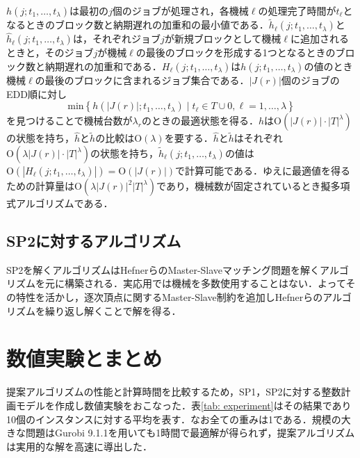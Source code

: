 \documentclass[twoside,twocolumn,11pt]{jarticle}  %
\begin{document}
$h(j; t_1, \dots, t_\lambda)$は最初の$j$個のジョブが処理され，各機械$\ell$の処理完了時間が$t_\ell$となるときのブロック数と納期遅れの加重和の最小値である．$\tilde{h}_\ell (j; t_1, \dots, t_\lambda)$と$\hat{h}_\ell (j; t_1, \dots, t_\lambda)$は，それぞれジョブ$j$が新規ブロックとして機械$\ell$に追加されるときと，そのジョブ$j$が機械$\ell$の最後のブロックを形成する1つとなるときのブロック数と納期遅れの加重和である．$H_\ell(j; t_1, \dots, t_\lambda)$は$h(j; t_1, \dots, t_\lambda)$の値のとき機械$\ell$の最後のブロックに含まれるジョブ集合である．$|J(r)|$個のジョブのEDD順に対し\[\mbox{min} \left\{ h(|J(r)|; t_1, \dots, t_\lambda) \mid t_\ell \in T \cup{0}, \ell = 1, \dots, \lambda \right\} \]を見つけることで機械台数が$\lambda_r$のときの最適状態を得る．$h$は$\mbox{O}(|J(r)|\cdot|T|^\lambda)$の状態を持ち，$\hat{h}$と$\tilde{h}$の比較は$\mbox{O}(\lambda)$を要する．$\hat{h}$と$\tilde{h}$はそれぞれ$\mbox{O}(\lambda|J(r)|\cdot|T|^\lambda)$の状態を持ち，$\tilde{h}_\ell(j; t_1, \dots, t_\lambda)$の値は$\mbox{O}(|H_\ell(j; t_1, \dots, t_\lambda) |)=\mbox{O}(|J(r)|)$で計算可能である．ゆえに最適値を得るための計算量は$\mbox{O}(\lambda|J(r)|^2|T|^\lambda)$であり，機械数が固定されているとき擬多項式アルゴリズムである．

\subsection{SP2に対するアルゴリズム}
SP2を解くアルゴリズムはHefnerら\cite{Hefner1995}のMaster-Slaveマッチング問題を解くアルゴリズムを元に構築される．実応用では機械を多数使用することはない．よってその特性を活かし，逐次頂点に関するMaster-Slave制約を追加しHefnerらのアルゴリズムを繰り返し解くことで解を得る．

\section{数値実験とまとめ}
提案アルゴリズムの性能と計算時間を比較するため，SP1，SP2に対する整数計画モデルを作成し数値実験をおこなった．表\ref{tab: experiment}はその結果であり10個のインスタンスに対する平均を表す．なお全ての重みは1である．規模の大きな問題はGurobi 9.1.1を用いても1時間で最適解が得られず，提案アルゴリズムは実用的な解を高速に導出した．
\end{document}
